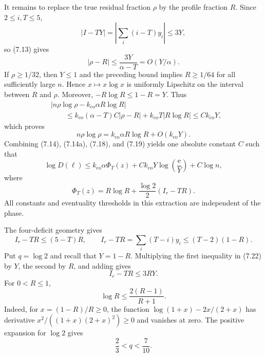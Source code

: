 It remains to replace the true residual fraction $\rho$ by the profile
fraction $R$. Since $2\le i,T\le5$,
\[
  |I-TY|=\left|\sum_i(i-T)y_i\right|\le3Y,
\]
so (7.13) gives
\[
  |\rho-R|\le\frac{3Y}{\alpha-T}=O(Y/\alpha).
\]
If $\rho\ge1/32$, then $Y\le1$ and the preceding bound implies
$R\ge1/64$ for all sufficiently large $n$. Hence $x\mapsto x\log x$ is
uniformly Lipschitz on the interval between $R$ and $\rho$. Moreover,
$-R\log R\le1-R=Y$. Thus
\[
\begin{aligned}
&\left|n\rho\log\rho
      -k_{\mathrm{co}}\alpha R\log R\right|\\
&\qquad\le
 k_{\mathrm{co}}(\alpha-T)C|\rho-R|
 +k_{\mathrm{co}}T|R\log R|
 \le Ck_{\mathrm{co}}Y,
\end{aligned}
\]
which proves
\begin{equation*}
 n\rho\log\rho
 =k_{\mathrm{co}}\alpha R\log R+O(k_{\mathrm{co}}Y).
 \tag{7.19}
\end{equation*}
Combining (7.14), (7.14a), (7.18), and (7.19) yields one absolute constant
$C$ such that
\begin{equation*}
 \log D(\ell)
 \le k_{\mathrm{co}}\alpha\Phi_T(z)
     +Ck_{\mathrm{co}}Y\log\!\left(\frac{\mathrm e}{Y}\right)
     +C\log n,
 \tag{7.20}
\end{equation*}
where
\begin{equation*}
 \Phi_T(z)=R\log R+\frac{\log 2}{2}(I_r-TR).
 \tag{7.21}
\end{equation*}
All constants and eventuality thresholds in this extraction are independent of
the phase.

The four-deficit geometry gives
\begin{equation*}
 I_r-TR\le(5-T)R,
 \qquad
 I_r-TR=\sum_i(T-i)y_i\le(T-2)(1-R).
 \tag{7.22}
\end{equation*}
Put $q=\log 2$ and recall that $Y=1-R$. Multiplying the first inequality in
(7.22) by $Y$, the second by $R$, and adding gives
\begin{equation*}
 I_r-TR\le3RY.
 \tag{7.22a}
 \label{eq:partial-diagonal-combined-structural-v3}
\end{equation*}
For $0<R\le1$,
\[
 \log R\le\frac{2(R-1)}{R+1}.
\]
Indeed, for $x=(1-R)/R\ge0$, the function
$\log(1+x)-2x/(2+x)$ has derivative
$x^2/((1+x)(2+x)^2)\ge0$ and vanishes at zero. The positive expansion for
$\log 2$ gives
\[
  \frac23<q<\frac7{10}.
\]


